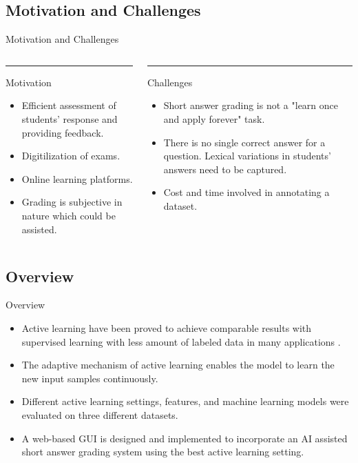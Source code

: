 \documentclass{beamer}
\begin{document}
\subsection{Motivation and Challenges}
\begin{frame}{Motivation and Challenges}
	
	
	\begin{columns}[T] %
		\begin{column}{.48\textwidth}
			\color{blue}\rule{\linewidth}{4pt}
			Motivation
			\begin{itemize}
				\item Efficient assessment of students' response and providing feedback.
				\item Digitilization of exams.
				\item Online learning platforms.
				\item Grading is subjective in nature which could be assisted.
			\end{itemize}
		\end{column}%
		\hfill%
		\begin{column}{.48\textwidth}
			\color{blue}\rule{\linewidth}{4pt}
			
			Challenges
			\begin{itemize}
				\item Short answer grading is not a "learn once and apply forever" task.
				\item There is no single correct answer for a question. Lexical variations in students' answers need to be captured.
				\item Cost and time involved in annotating a dataset.
			\end{itemize}
		\end{column}%
	\end{columns}
	
	
	
\end{frame}

\subsection{Overview}
\begin{frame}{Overview}
	\begin{itemize}
		\item Active learning have been proved to achieve comparable results with supervised learning with less amount of labeled data in many applications \cite{dligach2011} \cite{figueroa2012}.
		\item The adaptive mechanism of active learning enables the model to learn the new input samples continuously.
		\item Different active learning settings, features, and machine learning models were evaluated on three different datasets.
		\item A web-based GUI is designed and implemented to incorporate an AI assisted short answer grading system using the best active learning setting.
	\end{itemize}
\end{frame}
\end{document}
